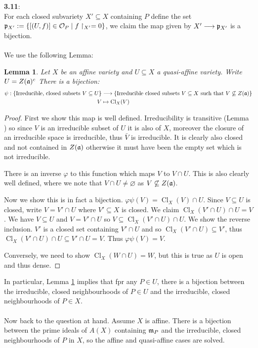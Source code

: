 \documentclass[12pt]{article}
\numberwithin{thm}{subsection}
\numberwithin{defn}{subsection}
\newtheorem{lemma}{Lemma}
\numberwithin{lemma}{subsection}
\numberwithin{example}{subsection}
\numberwithin{notation}{subsection}
\numberwithin{cor}{subsection}
\numberwithin{remark}{subsection}
\numberwithin{condition}{subsection}
\numberwithin{question}{subsection}
\numberwithin{construction}{subsection}
\numberwithin{construction}{subsection}
\numberwithin{construction}{subsection}
\newcommand{\call}[1]{\mathcal{#1}}
\newcommand{\lto}{\longrightarrow}
\begin{document}
%
\textbf{3.11}:\\
For each closed subvariety $X' \subseteq X$ containing $P$ define the set $\frak{p}_{X'} := \lbrace [(U,f)] \in \call{O}_P \mid f\restriction_{X'} = 0\rbrace$, we claim the map given by $X' \lto \frak{p}_{X'}$ is a bijection.\\\\
%
We use the following Lemma:
\begin{lemma}
\label{lem:torture}
Let $X$ be an affine variety and $U \subseteq X$ a quasi-affine variety. Write $U = Z(\frak{a})^c$ There is a bijection:
\begin{align*}
    \psi: \lbrace \text{Irreducible, closed subsets }V \subseteq U\rbrace &\lto \lbrace \text{Irreducible closed subsets }V \subseteq X\text{ such that }V \not\subseteq Z(\frak{a})\rbrace\\
    V &\mapsto \operatorname{Cl}_X(V)
\end{align*}
\end{lemma}
\begin{proof}
First we show this map is well defined. Irreducibility is transitive (Lemma \cite[\S Irreducible sets]{alggeonotes}) so since $V$ is an irreducible subset of $U$ it is also of $X$, moreover the closure of an irreducible space is irreducible, thus $\bar{V}$ is irreducible. It is clearly also closed and not contained in $Z(\frak{a})$ otherwise it must have been the empty set which is not irreducible.

There is an inverse $\varphi$ to this function which maps $V$ to $V \cap U$. This is also clearly well defined, where we note that $V \cap U \neq \varnothing$ as $V \not\subseteq Z(\frak{a})$.

Now we show this is in fact a bijection. $\varphi \psi (V) = \operatorname{Cl}_X(V) \cap U$. Since $V \subseteq U$ is closed, write $V = V' \cap U$ where $V' \subseteq X$ is closed. We claim $\operatorname{Cl}_X(V' \cap U) \cap U = V$. We have $V \subseteq U$ and $V = V' \cap U$ so $V \subseteq \operatorname{Cl}_X(V' \cap U) \cap U$. We show the reverse inclusion. $V'$ is a closed set containing $V' \cap U$ and so $\operatorname{Cl}_X(V' \cap U) \subseteq V'$, thus $\operatorname{Cl}_X(V' \cap U) \cap U \subseteq V' \cap U = V$. Thus $\varphi\psi(V) = V$.

Conversely, we need to show $\operatorname{Cl}_X(W \cap U) = W$, but this is true as $U$ is open and thus dense.
\end{proof}
In particular, Lemma \ref{lem:torture} implies that fpr any $P \in U$, there is a bijection between the irreducible, closed neighbourhoods of $P \in U$ and the irreducible, closed neighbourhoods of $P \in X$.\\\\
%
Now back to the question at hand. Assume $X$ is affine. There is a bijection between the prime ideals of $A(X)$ containing $\frak{m}_P$ and the irreducible, closed neighbourhoods of $P$ in $X$, so the affine and quasi-affine cases are solved.
\end{document}
